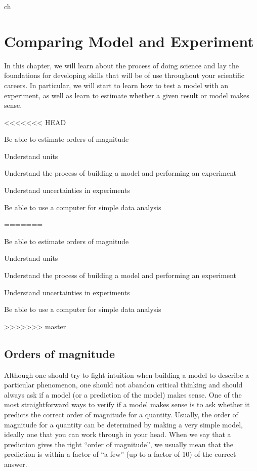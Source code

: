 ch%
%
\chapter{Comparing Model and Experiment}
\label{chap:2_ModelAndExperiment}
In this chapter, we will learn about the process of doing science and lay the foundations for developing skills that will be of use throughout your scientific careers. In particular, we will start to learn how to test a model with an experiment, as well as learn to estimate whether a given result or model makes sense.
\vspace{1cm}
\begin{learningObjectives}
<<<<<<< HEAD
{\item Be able to estimate orders of magnitude
\item Understand units
\item Understand the process of building a model and performing an experiment
\item Understand uncertainties in experiments
\item Be able to use a computer for simple data analysis}
=======
{
\item Be able to estimate orders of magnitude
\item Understand units
\item Understand the process of building a model and performing an experiment
\item Understand uncertainties in experiments
\item Be able to use a computer for simple data analysis
}
>>>>>>> master
\end{learningObjectives}

\section{Orders of magnitude}
Although one should try to fight intuition when building a model to describe a particular phenomenon, one should not abandon critical thinking and should always ask if a model (or a prediction of the model) makes sense. One of the most straightforward ways to verify if a model makes sense is to ask whether it predicts the correct order of magnitude for a quantity. Usually, the order of magnitude for a quantity can be determined by making a very simple model, ideally one that you can work through in your head. When we say that a prediction gives the right ``order of magnitude'', we usually mean that the prediction is within a factor of ``a few'' (up to a factor of 10) of the correct answer.

